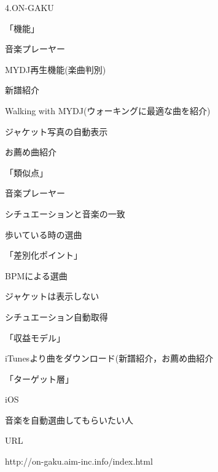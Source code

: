 \par
4.ON-GAKU
\par
「機能」
\par
音楽プレーヤー
\par
MYDJ再生機能(楽曲判別)
\par
新譜紹介
\par
Walking with MYDJ(ウォーキングに最適な曲を紹介)
\par
ジャケット写真の自動表示
\par
お薦め曲紹介
\par
「類似点」
\par
音楽プレーヤー
\par
シチュエーションと音楽の一致
\par
歩いている時の選曲
\par
「差別化ポイント」
\par
BPMによる選曲
\par
ジャケットは表示しない
\par
シチュエーション自動取得
\par
「収益モデル」
\par
iTunesより曲をダウンロード(新譜紹介，お薦め曲紹介
\par
「ターゲット層」
\par
iOS
\par
音楽を自動選曲してもらいたい人
\par
URL
\par
http://on-gaku.aim-inc.info/index.html
\\

